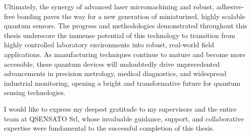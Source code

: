 Ultimately, the synergy of advanced laser micromachining and robust,
adhesive-free bonding paves the way for a new generation of miniaturized, highly
scalable quantum sensors. The progress and methodologies demonstrated throughout
this thesis underscore the immense potential of this technology to transition
from highly controlled laboratory environments into robust, real-world field
applications. As manufacturing techniques continue to mature and become more
accessible, these quantum devices will undoubtedly drive unprecedented
advancements in precision metrology, medical diagnostics, and widespread
industrial monitoring, opening a bright and transformative future for quantum
sensing technologies.

I would
like to express my deepest gratitude to my supervisors and the entire team at
QSENSATO Srl, whose invaluable guidance, support, and collaborative expertise
were fundamental to the successful completion of this thesis.